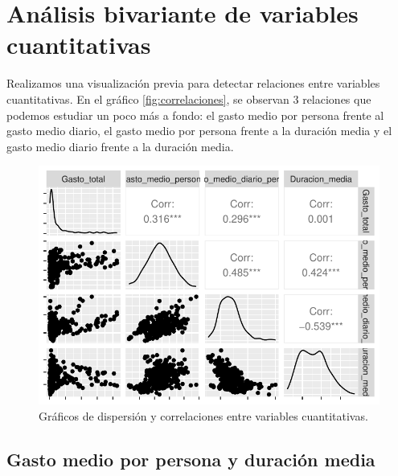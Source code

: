 \documentclass[data,article,submit,moreauthors,pdftex]{Definitions/mdpi}
\begin{document}
\section{Análisis bivariante de variables
cuantitativas}\label{anuxe1lisis-bivariante-de-variables-cuantitativas}

Realizamos una visualización previa para detectar relaciones entre
variables cuantitativas. En el gráfico \ref{fig:correlaciones}, se
observan 3 relaciones que podemos estudiar un poco más a fondo: el gasto
medio por persona frente al gasto medio diario, el gasto medio por
persona frente a la duración media y el gasto medio diario frente a la
duración media.

\begin{figure}[H]
\includegraphics{ProyectoAED2024_Rmd_files/figure-latex/unnamed-chunk-28-1} \caption{Gráficos de dispersión y correlaciones entre variables cuantitativas.\label{fig:correlaciones}}\label{fig:unnamed-chunk-28}
\end{figure}

\subsection{Gasto medio por persona y duración
media}\label{gasto-medio-por-persona-y-duraciuxf3n-media}
\end{document}

